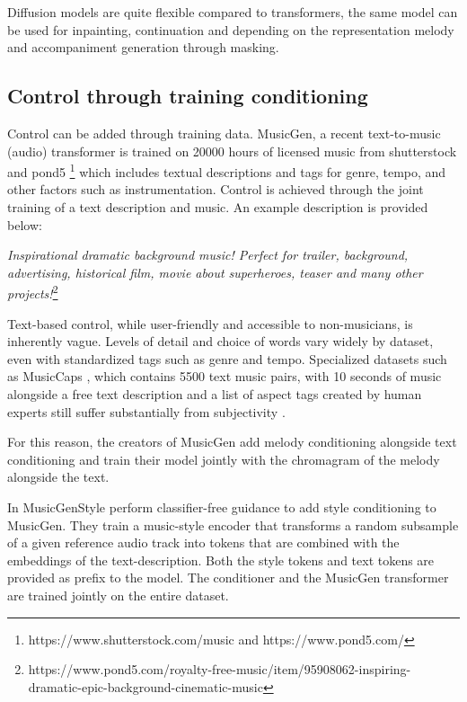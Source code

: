 Diffusion models are quite flexible compared to transformers, the same model can be used for inpainting, continuation and depending on the representation melody and accompaniment generation through masking.\cite{Min_Jiang_Xia_Zhao_polyffusion_2023}\cite{Rombach_Blattmann_Lorenz_Esser_Ommer_2022}

\subsection{Control through training conditioning}
Control can be added through training data. MusicGen\cite{copet2023simple}, a recent text-to-music (audio) transformer is trained on 20000 hours of licensed music from shutterstock and pond5 \footnote{https://www.shutterstock.com/music and https://www.pond5.com/} which includes textual descriptions and tags for genre, tempo, and other factors such as instrumentation. Control is achieved through the joint training of a text description and music. An example description is provided below: 

\textit{Inspirational dramatic background music! Perfect for trailer, background, advertising, historical film, movie about superheroes, teaser and many other projects!}\footnote{ https://www.pond5.com/royalty-free-music/item/95908062-inspiring-dramatic-epic-background-cinematic-music
}

Text-based control, while user-friendly and accessible to non-musicians, is inherently vague. Levels of detail and choice of words vary widely by dataset, even with standardized tags such as genre and tempo. Specialized datasets such as MusicCaps \cite{Agostinelli_Denk_Borsos_Engel_Verzetti_Caillon_Huang_Jansen_Roberts_Tagliasacchi_et_al._2023}, which contains 5500 text music pairs, with 10 seconds of music alongside a free text description and a list of aspect tags created by human experts still suffer substantially from subjectivity \cite{Lee_Doh_Jeong_2023_subjectivity_musiccaps}. 

For this reason, the creators of MusicGen \cite{copet2023simple} add melody conditioning alongside text conditioning and train their model jointly with the chromagram of the melody alongside the text.

In MusicGenStyle \cite{Rouard_Adi_Copet_Roebel_Défossez_musicgenstyle_2024} perform classifier-free guidance to add style conditioning to MusicGen. They train a music-style encoder that transforms a random subsample of a given reference audio track into tokens that are combined with the embeddings of the text-description. Both the style tokens and text tokens are provided as prefix to the model. The conditioner and the MusicGen transformer are trained jointly on the entire dataset. 

